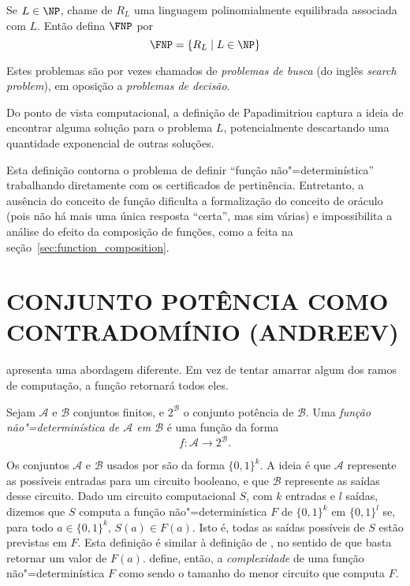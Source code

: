 \begin{definition}
    Se $L \in \NP$, chame de $R_L$
    uma linguagem polinomialmente equilibrada associada com $L$.
    Então defina $\FNP$ por
    \begin{equation*}
        \FNP = \{R_L \mid L \in \NP\}
    \end{equation*}
    \cite[p.~229]{Papadimitriou1994}
\end{definition}

Estes problemas são por vezes chamados de \emph{problemas de busca}
(do inglês \emph{search problem}),
em oposição a \emph{problemas de decisão}.

Do ponto de vista computacional,
a definição de Papadimitriou captura a ideia de
encontrar alguma solução para o problema $L$,
potencialmente descartando uma quantidade exponencial de outras soluções.

Esta definição contorna o problema de definir ``função não"=determinística''
trabalhando diretamente com os certificados de pertinência.
Entretanto,
a ausência do conceito de função
dificulta a formalização do conceito de oráculo
(pois não há mais uma única resposta ``certa'',
mas sim várias)
e impossibilita a análise do efeito da composição de funções,
como a feita na seção~\ref{sec:function_composition}.

\section{CONJUNTO POTÊNCIA COMO CONTRADOMÍNIO (ANDREEV)}

apresenta uma abordagem diferente.
Em vez de tentar amarrar algum dos ramos de computação,
a função retornará todos eles.

\begin{definition}
    Sejam $\mathcal A$ e $\mathcal B$ conjuntos finitos,
    e $2^\mathcal B$ o conjunto potência de $\mathcal B$.
    Uma \emph{função não"=determinística de $\mathcal A$ em $\mathcal B$}
    é uma função da forma
    \begin{equation*}
        f : \mathcal A \to 2^\mathcal B.
    \end{equation*}
    \cite[p.~3]{Andreev1994}
\end{definition}

Os conjuntos $\mathcal A$ e $\mathcal B$ usados por 
são da forma $\{0, 1\}^k$.
A ideia é que $\mathcal A$ represente as possíveis entradas para um circuito booleano,
e que $\mathcal B$ represente as saídas desse circuito.
Dado um circuito computacional $S$,
com $k$ entradas e $l$ saídas,
dizemos que $S$ computa a função não"=determinística $F$ de $\{0, 1\}^k$ em $\{0, 1\}^l$
se,
para todo $a \in \{0, 1\}^k$,
$S(a) \in F(a)$.
Isto é,
todas as saídas possíveis de $S$ estão previstas em $F$.
Esta definição é similar à definição de ,
no sentido de que basta retornar um valor de $F(a)$.
define, então,
a \emph{complexidade} de uma função não"=determinística $F$
como sendo o tamanho do menor circuito que computa $F$.

